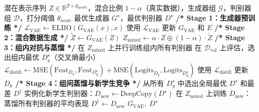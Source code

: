 \begin{algorithm}[H]
\caption{赛马场竞争与交叉校验详细流程}
\label{alg:highdim_mgca_detail}
\begin{algorithmic}[0]
\Require 潜在表示序列 $Z \in \mathbb{R}^{T \times d_{\text{model}}}$，混合比例 $1-\alpha$（真实数据），生成器组 $\mathcal{G}$，判别器组 $\mathcal{D}$，打分阈值 $\theta_{\text{score}}$
\Ensure 最优生成器 $G^{\star}$，最优判别器 $D^{\star}$
\Statex
\State \textbf{/* Stage 1：生成器预训练 */}
    \State $\mathcal{L}_{\text{VAE}} \leftarrow \text{ELBO}(G_{\text{VAE}}(x), x)$
    \State 使用 $\mathcal{L}_{\text{VAE}}$ 更新 $G_{\text{VAE}}$ 和 $E$
\EndFor
\Statex
\State \textbf{/* Stage 2：混合数据生成 */}
\State $\tilde{Z} \leftarrow G_{\text{VAE}}(Z)$ 
\State $Z_{\text{mixed}} \leftarrow \alpha \cdot Z \oplus (1-\alpha) \cdot \tilde{Z}$ 
\Statex
\State \textbf{/* Stage 3：组内对抗与蒸馏 */}
    \State 在 $Z_{\text{mixed}}$ 上并行训练组内所有判别器
    \State 在 $\mathcal{D}_{\text{val}}$ 上评估，选出组内最优 $D_g^{\star}$（交叉熵最小）
        \State $\mathcal{L}_{\text{distill}} \leftarrow \text{MSE}(\text{Feat}_{D_k}, \text{Feat}_{D_g^{\star}}) + \text{MSE}(\text{Logits}_{D_k}, \text{Logits}_{D_g^{\star}})$
        \State 使用 $\mathcal{L}_{\text{distill}}$ 更新 $D_k$
    \EndFor
\EndFor
\Statex
\State \textbf{/* Stage 4：组间蒸馏与新学生竞争 */}
\State 从所有 $D_g^{\star}$ 中选出全局最优 $D^{\star}$ 和最差 $D^{\dagger}$
\State 实例化新学生判别器：$D_{\text{new}} \leftarrow \text{DeepCopy}(D^{\star})$
\State 在 $Z_{\text{mixed}}$ 上训练 $D_{\text{new}}$：蒸馏所有判别器的平均表现
\State $D^{\dagger} \leftarrow D_{\text{new}}$ 
\Statex
\State \Return $G_{\text{VAE}},\; D^{\star}$
\end{algorithmic}
\end{algorithm}

